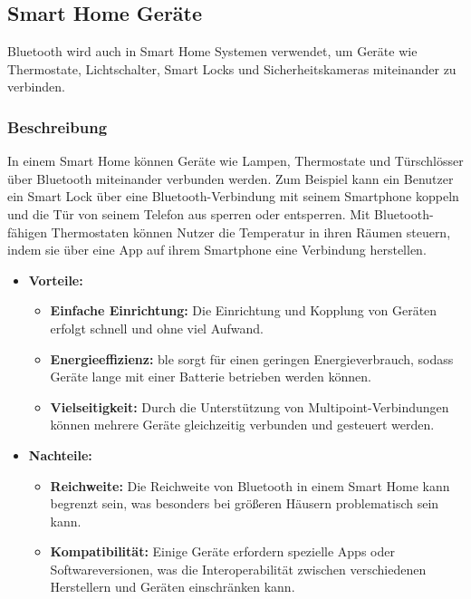 \subsection{Smart Home Geräte}
Bluetooth wird auch in Smart Home Systemen verwendet, um Geräte wie Thermostate, Lichtschalter, Smart Locks und Sicherheitskameras miteinander zu verbinden.

\subsubsection{Beschreibung}

In einem Smart Home können Geräte wie Lampen, Thermostate und Türschlösser über Bluetooth miteinander verbunden werden. Zum Beispiel kann ein Benutzer ein Smart Lock über eine Bluetooth-Verbindung mit seinem Smartphone koppeln und die Tür von seinem Telefon aus sperren oder entsperren. Mit Bluetooth-fähigen Thermostaten können Nutzer die Temperatur in ihren Räumen steuern, indem sie über eine App auf ihrem Smartphone eine Verbindung herstellen.  \cite{Gaum:2023}

\begin{itemize}
	\item \textbf{Vorteile:}
	\begin{itemize}
		\item \textbf{Einfache Einrichtung:} Die Einrichtung und Kopplung von Geräten erfolgt schnell und ohne viel Aufwand.
		\item \textbf{Energieeffizienz:} \ac{ble} sorgt für einen geringen Energieverbrauch, sodass Geräte lange mit einer Batterie betrieben werden können.
		\item \textbf{Vielseitigkeit:} Durch die Unterstützung von Multipoint-Verbindungen können mehrere Geräte gleichzeitig verbunden und gesteuert werden.
	\end{itemize}
	\item \textbf{Nachteile:}
	\begin{itemize}
		\item \textbf{Reichweite:} Die Reichweite von Bluetooth in einem Smart Home kann begrenzt sein, was besonders bei größeren Häusern problematisch sein kann.
		\item \textbf{Kompatibilität:} Einige Geräte erfordern spezielle Apps oder Softwareversionen, was die Interoperabilität zwischen verschiedenen Herstellern und Geräten einschränken kann.
	\end{itemize}
\end{itemize}

